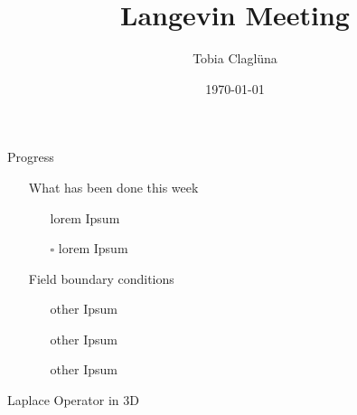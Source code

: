 
\title[\today]{Langevin Meeting}

\author{Tobia Claglüna}
\date{\today}
\def \myEmail {tobia.clagluena@psi.ch}





\begin{frame}{Progress}
        \begin{itemize}
            \item[\done] What has been done this week
                \begin{itemize}
                    \item[\done] lorem Ipsum
                    \item[$\square$] lorem Ipsum
                \end{itemize}

            \item[\done] Field boundary conditions
                \begin{itemize}
                    \item[\done] other Ipsum
                    \item[\done] other Ipsum
                    \item[\done] other Ipsum
                \end{itemize}
        \end{itemize}
\end{frame}


\begin{frame}[fragile]{Laplace Operator in 3D}
    \inputminted{c++}{./code_snippets/stencils.cpp}
    \inputminted{c++}{./code_snippets/operator.cpp}
\end{frame}


